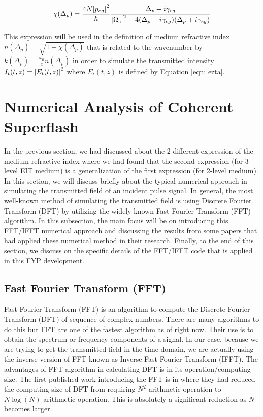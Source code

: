\begin{equation}
    \chi(\Delta_{p}) = \frac{4 N \abs{p_{eg}}^{2}}{\hbar} \frac{\Delta_{p} + i \gamma_{cg}}{\abs{\Omega_{c}}^{2} - 4(\Delta_{p} + i \gamma_{cg})(\Delta_{p} + i \gamma_{eg})}
\end{equation}

This expression will be used in the definition of medium refractive index $n(\Delta_{p}) = \sqrt{1 + \chi(\Delta_{p})}$ that is related to the wavenumber by $k(\Delta_{p}) = \frac{\omega_{0}}{c} n(\Delta_{p})$ in order to simulate the transmitted intensity $I_{t}(t, z) = \abs{E_{t}(t, z)}^{2}$ where $E_{t}(t, z)$ is defined by Equation \ref{eqn: ezta}.


\section{Numerical Analysis of Coherent Superflash}\label{numerical}
In the previous section, we had discussed about the 2 different expression of the medium refractive index where we had found that the second expression (for 3-level EIT medium) is a generalization of the first expression (for 2-level medium). In this section, we will discuss briefly about the typical numerical approach in simulating the transmitted field of an incident pulse signal. In general, the most well-known method of simulating the transmitted field is using Discrete Fourier Transform (DFT) by utilizing the widely known Fast Fourier Transform (FFT) algorithm. In this subsection, the main focus will be on introducing this FFT/IFFT numerical approach and discussing the results from some papers that had applied these numerical method in their research. Finally, to the end of this section, we discuss on the specific details of the FFT/IFFT code that is applied in this FYP development.

\subsection{Fast Fourier Transform (FFT)}
Fast Fourier Transform (FFT) is an algorithm to compute the Discrete Fourier Transform (DFT) of sequence of complex numbers. There are many algorithms to do this but FFT are one of the fastest algorithm as of right now. Their use is to obtain the spectrum or frequency components of a signal. In our case, because we are trying to get the transmitted field in the time domain, we are actually using the inverse version of FFT known as Inverse Fast Fourier Transform (IFFT). The advantages of FFT algorithm in calculating DFT is in its operation/computing size. The first published work introducing the FFT is in \cite{Cooley1965} where they had reduced the computing size of DFT from requiring $N^2$ arithmetic operation to $N \log(N)$ arithmetic operation. This is absolutely a significant reduction as $N$ becomes larger.

